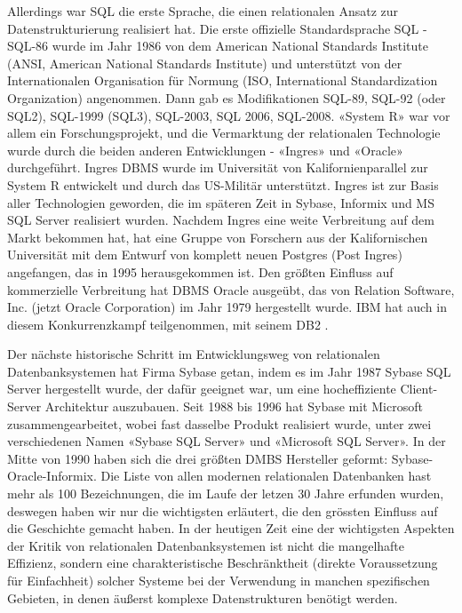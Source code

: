 Allerdings war SQL die erste Sprache, die einen relationalen Ansatz zur Datenstrukturierung realisiert hat. Die erste offizielle Standardsprache SQL - SQL-86 wurde im Jahr 1986 von dem American National Standards Institute (ANSI, American National Standards Institute) und unterstützt von der Internationalen Organisation für Normung (ISO, International Standardization Organization) angenommen. Dann gab es Modifikationen SQL-89, SQL-92 (oder SQL2), SQL-1999 (SQL3), SQL-2003, SQL 2006, SQL-2008. «System R» war vor allem ein Forschungsprojekt, und die Vermarktung der relationalen Technologie wurde durch die beiden anderen Entwicklungen - «Ingres» und «Oracle» durchgeführt. Ingres DBMS wurde im Universität von Kalifornienparallel zur System R entwickelt und durch das US-Militär unterstützt. Ingres ist zur Basis aller Technologien geworden, die im späteren Zeit in Sybase, Informix und MS SQL Server realisiert wurden. Nachdem Ingres eine weite Verbreitung auf dem Markt bekommen hat, hat eine Gruppe von Forschern aus der Kalifornischen Universität mit dem Entwurf von komplett neuen Postgres (Post Ingres) angefangen, das in 1995 herausgekommen ist. Den größten Einfluss auf kommerzielle Verbreitung hat DBMS Oracle ausgeübt, das von Relation Software, Inc. (jetzt Oracle Corporation) im Jahr 1979 hergestellt wurde. IBM hat auch in diesem Konkurrenzkampf teilgenommen, mit seinem DB2  \cite{stonebraker2005goes}.


Der nächste historische Schritt im Entwicklungsweg von relationalen Datenbanksystemen hat Firma Sybase getan, indem es im Jahr 1987 Sybase SQL Server hergestellt wurde, der dafür geeignet war, um eine hocheffiziente Client-Server Architektur auszubauen. Seit 1988 bis 1996 hat Sybase mit Microsoft zusammengearbeitet, wobei fast dasselbe Produkt realisiert wurde, unter zwei verschiedenen Namen «Sybase SQL Server» und «Microsoft SQL Server». In der Mitte von 1990 haben sich die drei größten DMBS Hersteller geformt: Sybase-Oracle-Informix. Die Liste von allen modernen relationalen Datenbanken hast mehr als 100 Bezeichnungen, die im Laufe der letzen 30 Jahre erfunden wurden, deswegen haben wir nur die wichtigsten erläutert, die den grössten Einfluss auf die Geschichte gemacht haben.
	In der heutigen Zeit eine der wichtigsten Aspekten der Kritik von relationalen Datenbanksystemen ist nicht die mangelhafte Effizienz, sondern eine charakteristische Beschränktheit (direkte Voraussetzung für Einfachheit) solcher Systeme bei der Verwendung in manchen spezifischen Gebieten, in denen äußerst komplexe Datenstrukturen benötigt werden.
    
